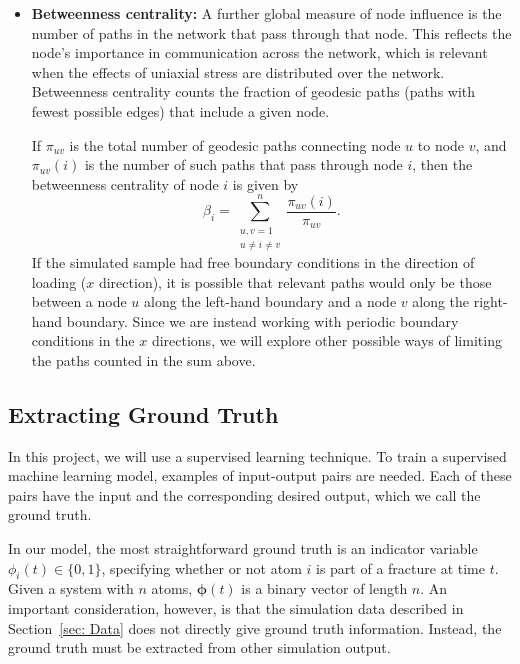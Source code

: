 \begin{itemize}
    \item\textbf{Betweenness centrality:} A further global measure of node influence is the number of paths in the network that pass through that node.  This reflects the node's importance in communication across the network, which is relevant when the effects of uniaxial stress are distributed over the network.  Betweenness centrality counts the fraction of geodesic paths (paths with fewest possible edges) that include a given node.
    
    If $\pi_{uv}$ is the total number of geodesic paths connecting node $u$ to node $v$, and $\pi_{uv}(i)$ is the number of such paths that pass through node $i$, then the betweenness centrality of node $i$ is given by
    \begin{equation}
    \beta_i = \sum_{\substack{u,v = 1 \\ u\neq i\neq v }}^n \frac{\pi_{uv}(i)}{\pi_{uv}}.
    \end{equation}
    If the simulated sample had free boundary conditions in the direction of loading ($x$ direction), it is possible that relevant paths would only be those between a node $u$ along the left-hand boundary and a node $v$ along the right-hand boundary.  Since we are instead working with periodic boundary conditions in the $x$ directions, we will explore other possible ways of limiting the paths counted in the sum above.

\end{itemize}

\subsection{Extracting Ground Truth}


In this project, we will use a supervised learning technique. To train a supervised machine learning model, examples of input-output pairs are needed. Each of these pairs have the input and the corresponding desired output, which we call the ground truth.

In our model, the most straightforward ground truth is an indicator variable $\phi_i(t) \in\{0,1\}$, specifying whether or not atom $i$ is part of a fracture at time $t$.
Given a system with $n$ atoms, $\boldsymbol{\phi}(t)$ is a binary vector of length $n$.  An important consideration, however, is that the simulation data described in Section~\ref{sec: Data} does not directly give ground truth information.  Instead, the ground truth must be extracted from other simulation output.

